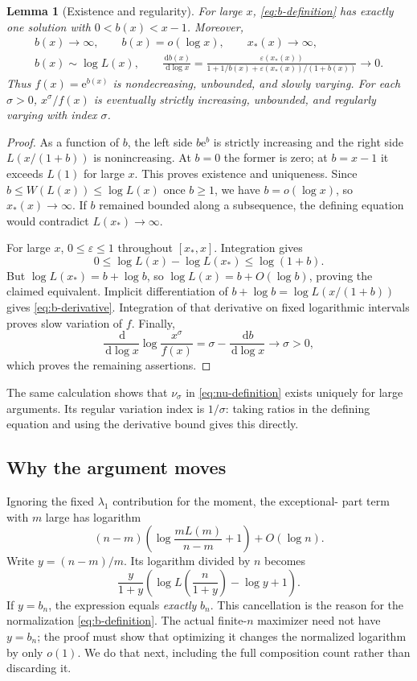 \documentclass[11pt,a4paper]{article}
\numberwithin{equation}{section}
\newtheorem{lemma}[theorem]{Lemma}
\theoremstyle{definition}
\theoremstyle{remark}
\newcommand{\eps}{\varepsilon}
\newcommand{\ee}{\mathrm e}
\newcommand{\dd}{\,\mathrm d}
\begin{document}
\begin{lemma}[Existence and regularity]
\label{lem:b}
For large $x$, \eqref{eq:b-definition} has exactly one solution with
$0<b(x)<x-1$. Moreover,
\begin{gather}
 b(x)\to\infty,\qquad b(x)=o(\log x),\qquad x_*(x)\to\infty,\\
 b(x)\sim\log L(x),\qquad
 \frac{\dd b(x)}{\dd\log x}
 =\frac{\eps(x_*(x))}
 {1+1/b(x)+\eps(x_*(x))/(1+b(x))}\longrightarrow0.
 \label{eq:b-derivative}
\end{gather}
Thus $f(x)=\ee^{b(x)}$ is nondecreasing, unbounded, and slowly varying.
For each $\sigma>0$, $x^\sigma/f(x)$ is eventually strictly increasing,
unbounded, and regularly varying with index $\sigma$.
\end{lemma}
\begin{proof}
As a function of $b$, the left side $b\ee^b$ is strictly increasing and
the right side $L(x/(1+b))$ is nonincreasing. At $b=0$ the former is zero;
at $b=x-1$ it exceeds $L(1)$ for large $x$. This proves existence and
uniqueness. Since $b\le W(L(x))\le\log L(x)$ once $b\ge1$, we have
$b=o(\log x)$, so $x_*(x)\to\infty$. If $b$ remained bounded along a
subsequence, the defining equation would contradict $L(x_*)\to\infty$.

For large $x$, $0\le\eps\le1$ throughout $[x_*,x]$. Integration gives
\[
 0\le\log L(x)-\log L(x_*)\le\log(1+b).
\]
But $\log L(x_*)=b+\log b$, so $\log L(x)=b+O(\log b)$, proving the
claimed equivalent. Implicit differentiation of
$b+\log b=\log L(x/(1+b))$ gives \eqref{eq:b-derivative}.
Integration of that derivative on fixed logarithmic intervals proves
slow variation of $f$. Finally,
\[
 \frac{\dd}{\dd\log x}\log\frac{x^\sigma}{f(x)}
 =\sigma-\frac{\dd b}{\dd\log x}\longrightarrow\sigma>0,
\]
which proves the remaining assertions.
\end{proof}

The same calculation shows that $\nu_\sigma$ in
\eqref{eq:nu-definition} exists uniquely for large arguments. Its regular
variation index is $1/\sigma$: taking ratios in the defining equation
and using the derivative bound gives this directly.

\subsection{Why the argument moves}
Ignoring the fixed $\lambda_1$ contribution for the moment, the exceptional-
part term with $m$ large has logarithm
\[
 (n-m)\left(\log\frac{mL(m)}{n-m}+1\right)+O(\log n).
\]
Write $y=(n-m)/m$. Its logarithm divided by $n$ becomes
\begin{equation}
 \frac{y}{1+y}
 \left(\log L\!\left(\frac{n}{1+y}\right)-\log y+1\right).
 \label{eq:y-envelope}
\end{equation}
If $y=b_n$, the expression equals \emph{exactly} $b_n$.
This cancellation is the reason for the normalization
\eqref{eq:b-definition}. The actual finite-$n$ maximizer need not have
$y=b_n$; the proof must show that optimizing it changes the normalized
logarithm by only $o(1)$. We do that next, including the full composition
count rather than discarding it.
\end{document}

